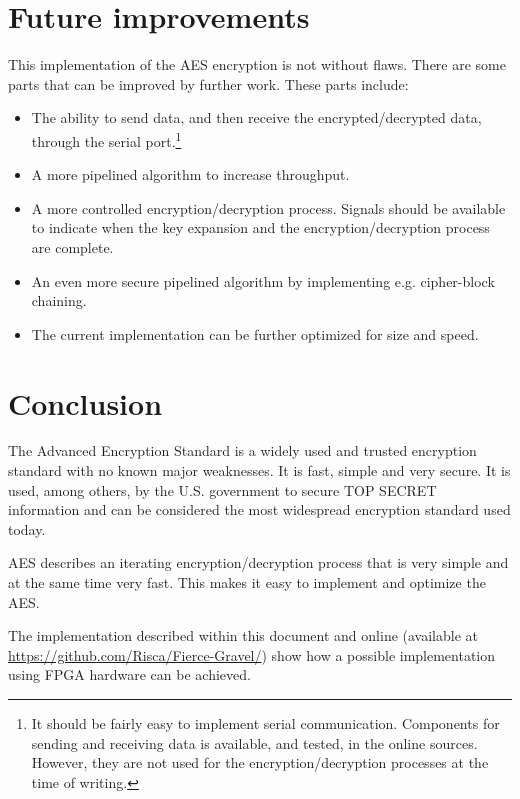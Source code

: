 \documentclass{report}
\begin{document}
\chapter{Future improvements}
This implementation of the AES encryption is not without flaws. There are some parts that can be improved by further work. These parts include:
\begin{itemize}
\item The ability to send data, and then receive the encrypted/decrypted data, through the serial port.\footnote{It should be fairly easy to implement serial communication. Components for sending and receiving data is available, and tested, in the online sources. However, they are not used for the encryption/decryption processes at the time of writing.}
\item A more pipelined algorithm to increase throughput.
\item A more controlled encryption/decryption process. Signals should be available to indicate when the key expansion and the encryption/decryption process are complete.
\item An even more secure pipelined algorithm by implementing e.g. cipher-block chaining.
\item The current implementation can be further optimized for size and speed.
\end{itemize}

\chapter{Conclusion}
The Advanced Encryption Standard is a widely used and trusted encryption standard with no known major weaknesses.\cite{attacks} It is fast, simple and very secure. It is used, among others, by the U.S. government to secure TOP SECRET information and can be considered the most widespread encryption standard used today.

AES describes an iterating encryption/decryption process that is very simple and at the same time very fast. This makes it easy to implement and optimize the AES.

The implementation described within this document and online (available at \url{https://github.com/Risca/Fierce-Gravel/}) show how a possible implementation using FPGA hardware can be achieved.

\end{document}
